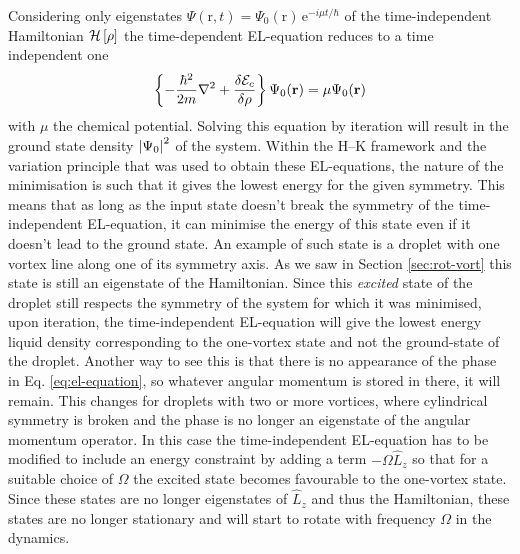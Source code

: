 \documentclass[12pt,a4paper]{book}
\renewcommand{\vec}[1]{\bm{\mathrm{#1}}}
\newcommand{\unit}[1]{\,\mathrm{#1}}
\begin{document}
		Considering only eigenstates $\Psi(\vec{r},t)=\Psi_0(\vec{r})\unit{e}^{-i\mu t/\hbar}$ of the time-independent Hamiltonian ${\cal H}\left[\rho\right]$ the time-dependent EL-equation reduces to a time independent one
		\begin{align}
			\left\{-\frac{\hbar^2}{2m} \laplacian + \frac{\delta {\cal E}_{c}}{\delta \rho}\right\}\Psi_0(\textbf{r}) = \mu\Psi_0(\textbf{r})
			\label{eq:el-equation}
		\end{align}
		with $\mu$ the chemical potential. Solving this equation by iteration will result in the ground state density $\abs{\Psi_0}^2$ of the system. Within the H--K framework and the variation principle that was used to obtain these EL-equations, the nature of the minimisation is such that it gives the lowest energy for the given symmetry. This means that as long as the input state doesn't break the symmetry of the time-independent EL-equation, it can minimise the energy of this state even if it doesn't lead to the ground state. An example of such state is a droplet with one vortex line along one of its symmetry axis. As we saw in Section \ref{sec:rot-vort} this state is still an eigenstate of the Hamiltonian. Since this \emph{excited} state of the droplet still respects the symmetry of the system for which it was minimised, upon iteration, the time-independent EL-equation will give the lowest energy liquid density corresponding to the one-vortex state and not the ground-state of the droplet. Another way to see this is that there is no appearance of the phase in Eq. \ref{eq:el-equation}, so whatever angular momentum is stored in there, it will remain. This changes for droplets with two or more vortices, where cylindrical symmetry is broken and the phase is no longer an eigenstate of the angular momentum operator. In this case the time-independent EL-equation has to be modified to include an energy constraint by adding a term $-\Omega\hat{L}_z$ so that for a suitable choice of $\Omega$ the excited state becomes favourable to the one-vortex state. Since these states are no longer eigenstates of $\hat{L}_z$ and thus the Hamiltonian, these states are no longer stationary and will start to rotate with frequency $\Omega$ in the dynamics.\\
\end{document}
